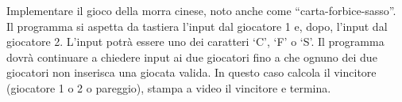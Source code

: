 \begin{Exercise}[label={ex:scf}]
  Implementare il gioco della morra cinese, noto anche come ``carta-forbice-sasso''. Il programma si aspetta da tastiera l'input dal giocatore 1 e, dopo, l'input dal giocatore 2. L'input potrà essere uno dei caratteri `C', `F' o `S'. Il programma dovrà continuare a chiedere input ai due giocatori fino a che ognuno dei due giocatori non inserisca una giocata valida. In questo caso calcola il vincitore (giocatore 1 o 2 o pareggio), stampa a video il vincitore e termina.
\end{Exercise}

\begin{Answer}[ref={ex:scf}]
  
\end{Answer}